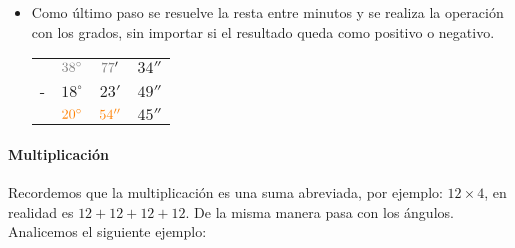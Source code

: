 \begin{example}
\begin{itemize}
	\item Como último paso se resuelve la resta entre minutos y se realiza 
	la operación con los grados, sin importar si el resultado queda como positivo 
	o negativo.
	\begin{center}
		\begin{tabular}{ c c c c}
				& $\textcolor{gray}{38^\circ}$ & 
				$\textcolor{gray}{77}'$ & 
				$34''$ \\
			- & $18^\circ$  & $23'$ & $49''$ \\
			\hline
			& $\textcolor{orange}{20^\circ}$ & $\textcolor{orange}{54''}$  & $45''$
		\end{tabular}
	\end{center}		

	\end{itemize}

\end{example}

\paragraph{Multiplicación}
Recordemos que la multiplicación es una suma abreviada, por ejemplo:
$12 \times 4$, en realidad es $12 + 12 + 12 +12$. De la misma manera pasa 
con los ángulos. Analicemos el siguiente ejemplo:

